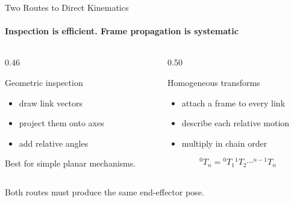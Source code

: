\documentclass[aspectratio=169]{beamer}
\begin{document}
\begin{frame}[t]{Two Routes to Direct Kinematics}
    \framesubtitle{Inspection is efficient. Frame propagation is systematic}
    \begin{columns}[T,onlytextwidth]
        \begin{column}{0.46\textwidth}
            \begin{block}{Geometric inspection}
                \begin{itemize}
                    \item draw link vectors
                    \item project them onto axes
                    \item add relative angles
                \end{itemize}
            \end{block}
            Best for simple planar mechanisms.
        \end{column}
        \begin{column}{0.50\textwidth}
            \begin{block}{Homogeneous transforms}
                \begin{itemize}
                    \item attach a frame to every link
                    \item describe each relative motion
                    \item multiply in chain order
                \end{itemize}
            \end{block}
            \[
                {}^{0}T_n={}^{0}T_1{}^{1}T_2\cdots{}^{n-1}T_n
            \]
        \end{column}
    \end{columns}
    \medskip
    \centering
    Both routes must produce the same end-effector pose.
\end{frame}
\end{document}
